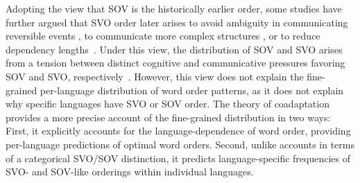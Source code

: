 \documentclass[11pt,a4paper]{article}
\begin{document}
Adopting the view that SOV is the historically earlier order, some studies have further argued that SVO order later arises to avoid ambiguity in communicating reversible events \citep{gibson-noisy-channel-2013, hall2013cognitive}, to communicate more complex structures \citep{langus2010cognitive, schouwstra2011semantic, marno2015a}, or to reduce dependency lengths~\citep{ferrer-i-cancho-placement-2017}.
Under this view, the distribution of SOV and SVO arises from a tension between distinct cognitive and communicative pressures favoring SOV and SVO, respectively~\citep{langus2010cognitive}.
However, this view does not explain the fine-grained per-language distribution of word order patterns, as it does not explain why specific languages have SVO or SOV order.
The theory of coadaptation provides a more precise account of the fine-grained distribution in two ways: First, it explicitly accounts for the language-dependence of word order, providing per-language predictions of optimal word orders.
Second, unlike accounts in terms of a categorical SVO/SOV distinction, it predicts language-specific frequencies of SVO- and SOV-like orderings within individual languages.













\end{document}
